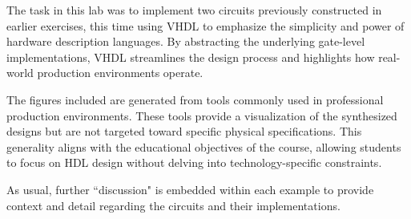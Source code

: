\documentclass[12pt]{article}
\begin{document}
The task in this lab was to implement two circuits previously constructed in
earlier exercises, this time using VHDL to emphasize the simplicity and power of
hardware description languages. By abstracting the underlying gate-level
implementations, VHDL streamlines the design process and highlights how
real-world production environments operate.

The figures included are generated from tools commonly used in professional production environments. These tools provide a visualization of the synthesized designs but are not targeted toward specific physical specifications. This generality aligns with the educational objectives of the course, allowing students to focus on HDL design without delving into technology-specific constraints.

As usual, further ``discussion" is embedded within each example to provide context and detail regarding the circuits and their implementations. 
\end{document}
